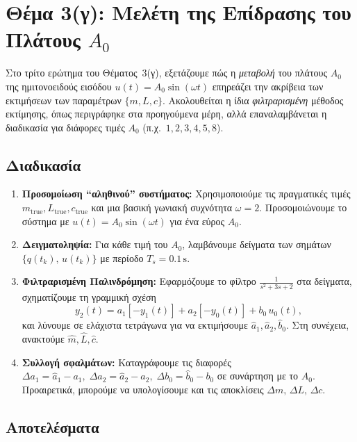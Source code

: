 \documentclass[a4paper,12pt]{report}
\begin{document}
\section{Θέμα 3(γ): Μελέτη της Επίδρασης του Πλάτους \(A_0\)}

Στο τρίτο ερώτημα του Θέματος~3(γ), εξετάζουμε πώς η \emph{μεταβολή} του πλάτους \(A_0\) της ημιτονοειδούς εισόδου \(u(t)=A_0\sin(\omega t)\) επηρεάζει την ακρίβεια των εκτιμήσεων των παραμέτρων \(\{m,L,c\}\). Ακολουθείται η ίδια \emph{φιλτραρισμένη} μέθοδος εκτίμησης, όπως περιγράφηκε στα προηγούμενα μέρη, αλλά επαναλαμβάνεται η διαδικασία για διάφορες τιμές \(A_0\) (π.χ.\ \(1,2,3,4,5,8\)).

\subsection*{Διαδικασία}

\begin{enumerate}
    \item \textbf{Προσομοίωση ``αληθινού'' συστήματος:}
    Χρησιμοποιούμε τις πραγματικές τιμές \(m_{\mathrm{true}},L_{\mathrm{true}},c_{\mathrm{true}}\) και μια βασική γωνιακή συχνότητα \(\omega=2\). Προσομοιώνουμε το σύστημα με $u(t)=A_0 \sin(\omega t)$ για ένα εύρος \(A_0\).
    
    \item \textbf{Δειγματοληψία:}
    Για κάθε τιμή του \(A_0\), λαμβάνουμε δείγματα των σημάτων \(\bigl\{q(t_k),\,u(t_k)\bigr\}\) με περίοδο \(T_s=0.1\,\mathrm s\).

    \item \textbf{Φιλτραρισμένη Παλινδρόμηση:}
    Εφαρμόζουμε το φίλτρο \(\tfrac{1}{s^2 + 3s + 2}\) στα δείγματα, σχηματίζουμε τη γραμμική σχέση 
    \[
    y_2(t) = a_1[-y_1(t)] + a_2[-y_0(t)] + b_0\,u_0(t),
    \]
    και λύνουμε σε ελάχιστα τετράγωνα για να εκτιμήσουμε \(\hat{a}_1,\hat{a}_2,\hat{b}_0\). Στη συνέχεια, ανακτούμε \(\hat{m},\hat{L},\hat{c}\).

    \item \textbf{Συλλογή σφαλμάτων:}
    Καταγράφουμε τις διαφορές \(\Delta a_1 = \hat{a}_1 - a_1,\;\Delta a_2 = \hat{a}_2 - a_2,\;\Delta b_0 = \hat{b}_0 - b_0\) σε συνάρτηση με το \(A_0\). Προαιρετικά, μπορούμε να υπολογίσουμε και τις αποκλίσεις \(\Delta m,\,\Delta L,\,\Delta c\).
\end{enumerate}

\subsection*{Αποτελέσματα}
\end{document}
